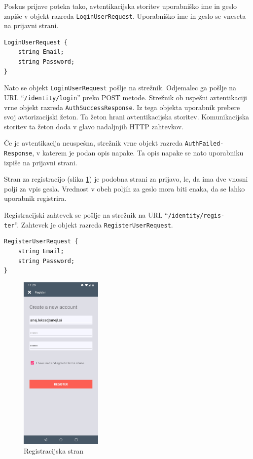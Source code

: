 \documentclass[a4paper, 12pt]{book}
\begin{document}
Poskus prijave poteka tako, avtentikacijska storitev uporabniško ime in geslo zapiše v objekt razreda \texttt{LoginUserRequest}.
Uporabniško ime in geslo se vneseta na prijavni strani.

\begin{Verbatim}[commandchars=+\[\]]
LoginUserRequest {
    string Email; 
    string Password;
}
\end{Verbatim}

Nato se objekt \texttt{LoginUserRequest} pošlje na strežnik.
Odjemalec ga pošlje na URL \enquote{\texttt{/identity/login}} preko POST metode.
Strežnik ob uspešni avtentikaciji vrne objekt razreda \texttt{AuthSuccessResponse}.
Iz tega objekta uporabnik prebere svoj avtorizacijski žeton.
Ta žeton hrani avtentikacijska storitev.
Komunikacijska storitev ta žeton doda v glavo nadaljnjih HTTP zahtevkov.

Če je avtentikacija neuspešna, strežnik vrne objekt razreda \texttt{AuthFailed-\\Response}, v katerem je podan opis napake.
Ta opis napake se nato uporabniku izpiše na prijavni strani.

Stran za registracijo (slika \ref{app_register}) je podobna strani za prijavo, le, da ima dve vnosni polji za vpis gesla.
Vrednost v obeh poljih za geslo mora biti enaka, da se lahko uporabnik registrira.

Registracijski zahtevek se pošlje na strežnik na URL \enquote{\texttt{/identity/regis-\\ter}}.
Zahtevek je objekt razreda \texttt{RegisterUserRequest}.

\begin{Verbatim}[commandchars=+\[\]]
RegisterUserRequest {
    string Email; 
    string Password;
}
\end{Verbatim}

\begin{figure}[H]
\begin{center}
\includegraphics[width=4cm]{app_register}
\end{center}
	\caption{Registracijska stran}
\label{app_register}
\end{figure}
\end{document}

